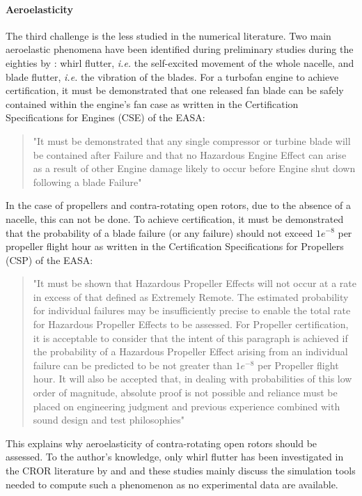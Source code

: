 \paragraph{Aeroelasticity}
The third challenge is the less studied in the numerical literature.
Two main aeroelastic phenomena have been identified during preliminary studies
during the eighties by \citet{Hager1988}: whirl flutter, \emph{i.e.} the self-excited
movement of the whole nacelle, and blade flutter, \emph{i.e.} the vibration
of the blades.
For a turbofan engine to achieve certification, it must be 
demonstrated that one released fan blade can be safely contained 
within the engine’s fan case as written in the 
Certification Specifications for Engines (CSE) of the EASA:
\begin{quote}
	"It must be demonstrated that any single compressor or turbine blade will be contained after Failure and 
that no Hazardous Engine Effect can arise as a result of other Engine damage likely to occur before 
Engine shut down following a blade Failure"
\end{quote}
In the case of propellers and contra-rotating open rotors, due to the absence of a nacelle,
this can not be done. To achieve certification, it must be demonstrated that the probability of a blade
failure (or any failure) should not exceed $1e^{-8}$ per propeller flight hour as written in 
the Certification Specifications for Propellers (CSP) of the EASA:
\begin{quote}
	"It must be shown that Hazardous Propeller Effects will not occur at a rate in excess of that defined 
as Extremely Remote. The estimated probability for individual failures may be insufficiently precise 
to enable the total rate for Hazardous Propeller Effects to be assessed. For Propeller certification, it 
is acceptable to consider that the intent of this paragraph is achieved if the probability of a 
Hazardous Propeller Effect arising from an individual failure can be predicted to be not greater than 
$1e^{-8}$ per Propeller flight hour. It will also be accepted that, in dealing with probabilities of this low 
order of magnitude, absolute proof is not possible and reliance must be placed on engineering 
judgment and previous experience combined with sound design and test philosophies" 
\end{quote}
This explains why aeroelasticity of contra-rotating open rotors should be assessed.
To the author's knowledge, only whirl flutter has been investigated
in the CROR literature by \citet{CISicot2011a} and 
\citet{Verley2013} and these studies mainly
discuss the simulation tools needed to compute such a phenomenon as
no experimental data are available.
